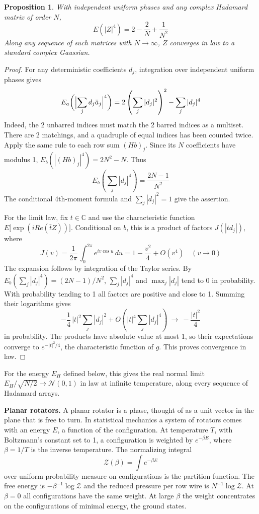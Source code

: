 \documentclass[11pt,a4paper]{article}
\newtheorem{prop}[thm]{Proposition}
\theoremstyle{remark}
\begin{document}
\begin{samepage}
\begin{prop}\label{prop:ind}
With independent uniform phases and any complex Hadamard matrix of order $N$,
\[
  E(|Z|^4)=2-\frac{2}{N}+\frac{1}{N^2}
\]
Along any sequence of such matrices with $N\to\infty$, $Z$ converges in
law to a standard complex Gaussian.
\end{prop}
\end{samepage}
\begin{proof}
For any deterministic coefficients $d_j$, integration over independent
uniform phases gives
\[
 E_a\bigg(\Bigl|\sum_j d_j\bar a_j\Bigr|^4\bigg)
      =2\left(\sum_j|d_j|^2\right)^2-\sum_j|d_j|^4
\]
Indeed, the 2 unbarred indices must match the 2 barred indices as a
multiset. There are 2 matchings, and a quadruple of equal indices has
been counted twice. Apply the same rule to each row sum $(Hb)_j$. Since its
$N$ coefficients have modulus 1, $E_b(|(Hb)_j|^4)=2N^2-N$. Thus
\[
 E_b\left(\sum_j |d_j|^4\right)=\frac{2N-1}{N^2}
\]
The conditional 4th-moment formula and $\sum_j|d_j|^2=1$ give the assertion.

For the limit law, fix $t\in\mathbb C$ and use the characteristic function
$E\big[\exp(iRe(\bar tZ))\big]$. Conditional on $b$, this is a
product of factors $J(|t d_j|)$, where
\[
 J(v)=\frac1{2\pi}\,\int_0^{2\pi}e^{iv\cos u}\,du
     =1-\frac{v^2}{4}+O(v^4)\quad(v\to0)
\]
The expansion follows by integration of the Taylor series. By
$E_b\left(\sum_j|d_j|^4\right)=(2N-1)/N^2$, $\sum_j|d_j|^4$ and $\max_j|d_j|$ tend to 0 in
probability. With probability tending to 1 all factors are positive and
close to 1. Summing their logarithms gives
\[
  -\frac14\,|t|^2\sum_j|d_j|^2
       +O\!\left(|t|^4\sum_j|d_j|^4\right)
       \ \to\ -\frac{|t|^2}{4}
\]
in probability. The products have absolute value at most 1, so their
expectations converge to $e^{-|t|^2/4}$, the characteristic function of
$g$. This proves convergence in law.
\end{proof}

For the energy $E_H$ defined below, this gives the real normal limit $E_H/\sqrt{N/2}\to\mathcal N(0,1)$ in law at infinite temperature, along every sequence of Hadamard arrays.

\medskip
\noindent\textbf{Planar rotators.}
A planar rotator is a phase, thought of as a unit vector in the plane that is free to turn. In statistical mechanics a system of rotators comes with an energy $E$, a function of the configuration. At temperature $T$, with Boltzmann's constant set to 1, a configuration is weighted by $e^{-\beta E}$, where $\beta=1/T$ is the inverse temperature. The normalizing integral
\[
 \mathcal Z(\beta)=\int e^{-\beta E}
\]
over uniform probability measure on configurations is the partition function. The free energy is $-\beta^{-1}\log\mathcal Z$ and the reduced pressure per row wire is $N^{-1}\log\mathcal Z$. At $\beta=0$ all configurations have the same weight. At large $\beta$ the weight concentrates on the configurations of minimal energy, the ground states.
\end{document}

